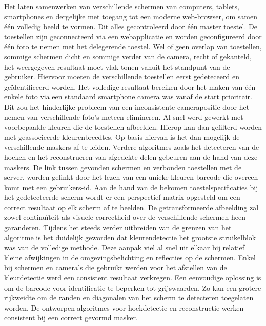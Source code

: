 Het laten samenwerken van verschillende schermen van computers, tablets, smartphones en dergelijke met toegang tot een moderne web-browser, om samen één volledig beeld te vormen. Dit alles gecontroleerd door één master toestel. De toestellen zijn geconnecteerd via een webapplicatie en worden geconfigureerd door één foto te nemen met het delegerende toestel. Wel of geen overlap van toestellen, sommige schermen dicht en sommige verder van de camera, recht of gekanteld, het weergegeven resultaat moet vlak tonen vanuit het standpunt van de gebruiker.
\bigskip
Hiervoor moeten de verschillende toestellen eerst gedeteceerd en geïdentificeerd worden. Het volledige resultaat bereiken door het maken van één enkele foto via een standaard smartphone camera was vanaf de start prioritair. Dit zou het hinderlijke probleem van een inconsistente camerapositie door het nemen van verschillende foto’s meteen elimineren. Al snel werd gewerkt met voorbepaalde kleuren die de toestellen afbeelden. Hierop kan dan gefilterd worden met geassocieerde kleurenbreedtes. Op basis hiervan is het dan mogelijk de verschillende maskers af te leiden. Verdere algoritmes zoals het detecteren van de hoeken en het reconstrueren van afgedekte delen gebeuren aan de hand van deze maskers. De link tussen gevonden schermen en verbonden toestellen met de server, worden gelinkt door het lezen van een unieke kleuren-barcode die overeen komt met een gebruikers-id. Aan de hand van de bekomen toestelspecificaties bij  het gedetecteerde scherm wordt er een perspectief matrix opgesteld om een correct resultaat op elk scherm af te beelden. De getransformeerde afbeelding zal zowel continuïteit als visuele correctheid over de verschillende schermen heen garanderen.
\bigskip
Tijdens het steeds verder uitbreiden van de grenzen van het algoritme is het duidelijk geworden dat kleurendetectie het grootste struikelblok was van de volledige methode. Deze aanpak viel al snel uit elkaar bij relatief kleine afwijkingen in de omgevingsbelichting en reflecties op de schermen. Enkel bij schermen en camera’s die gebruikt werden voor het afstellen van de kleurdetectie werd een consistent resultaat verkregen. Een eenvoudige oplossing is om de barcode voor identificatie te beperken tot grijswaarden. Zo kan een grotere rijkweidte om de randen en diagonalen van het scherm te detecteren toegelaten worden. De ontworpen algoritmes voor hoekdetectie en reconstructie werken consistent bij een correct gevormd masker.
